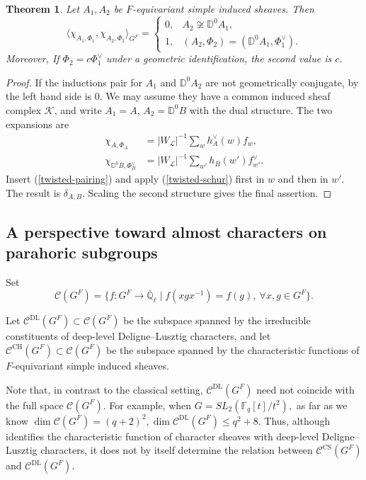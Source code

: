 \documentclass[11pt,letterpaper]{amsart}
\newtheorem{theorem}{Theorem}
\theoremstyle{definition}
\numberwithin{equation}{section}
\numberwithin{theorem}{section}
\begin{document}
\begin{theorem}\label{simple-orth}
Let $A_1,A_2$ be $F$-equivariant simple induced sheaves. Then
\[
 \langle \chi_{A_1,\Phi_1},\chi_{A_2,\Phi_2}\rangle_{G^F}
 =\begin{cases}
 0,&A_2\not\cong\mathbb D^0A_1,\\
 1,&(A_2,\Phi_2)=(\mathbb D^0A_1,\Phi_1^\vee).
 \end{cases}
\]
Moreover, If $\Phi_2=c\Phi_1^\vee$ under a geometric identification, the
second value is $c$.
\end{theorem}
\begin{proof}
If the inductions pair for $A_1$ and $\mathbb D^0A_2$ are not
geometrically conjugate, by  the left hand side is $0$. We may assume they have a common induced
sheaf complex $\mathcal K$, and write $A_1=A$, $A_2=\mathbb D^0B$
with the dual structure. The two expansions are
\[
\begin{aligned}
 \chi_{A,\Phi_A}&=|W_{\mathcal L}|^{-1}\sum_w h_A^\vee(w)f_w,\\
 \chi_{\mathbb D^0B,\Phi_B^\vee}
       &=|W_{\mathcal L}|^{-1}\sum_{w'}h_B(w')f_{w'}^\vee.
\end{aligned}
\]
Insert (\ref{twisted-pairing}) and apply (\ref{twisted-schur})
first in $w$ and then in $w'$. The result is $\delta_{A,B}$. Scaling the second structure
gives the final assertion.
\end{proof}

\subsection{A perspective toward almost characters on parahoric subgroups}

Set
$$
\mathcal C(G^F)
=
\{f:G^F\to\overline{\mathbb Q}_\ell
\mid
f(xgx^{-1})=f(g),\ \forall x,g\in G^F\}.
$$

Let
$
\mathcal C^{\mathrm{DL}}(G^F)\subset \mathcal C(G^F)
$
be the subspace spanned by the irreducible constituents of deep-level Deligne--Lusztig characters, and let
$
\mathcal C^{\mathrm{CH}}(G^F)\subset \mathcal C(G^F)
$
be the subspace spanned by the characteristic functions of $F$-equivariant simple induced sheaves.

Note that, in contrast to the classical setting, $\mathcal C^{\mathrm{DL}}(G^F)$ need not coincide with the full space $\mathcal C(G^F)$. For example, when
$
G=SL_2(\mathbb F_q[t]/t^2),
$
as far as we know
$
\dim \mathcal C(G^F)=(q+2)^2,
\dim \mathcal C^{\mathrm{DL}}(G^F)\le q^2+8.
$
Thus, although  identifies the characteristic function of  character sheaves with deep-level Deligne--Lusztig characters, it does not by itself determine the relation between $\mathcal C^{\mathrm{CS}}(G^F)$ and $\mathcal C^{\mathrm{DL}}(G^F)$.
\end{document}
